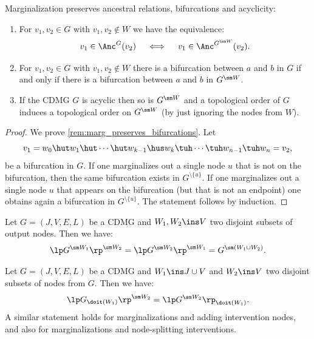 \begin{Rem}\label{rem:marg_preserves_ancestors_bifurcations_acyclicity}
Marginalization preserves ancestral relations, bifurcations and acyclicity:
    \begin{enumerate}
        \item For $v_1,v_2 \in G$ with $v_1,v_2 \notin W$ we have the equivalence:
            \[ v_1 \in \Anc^G(v_2)\quad \iff \quad v_1 \in \Anc^{G^{\sm W}}(v_2).   \]
          \item For $v_1,v_2 \in G$ with $v_1,v_2 \notin W$ there is a bifurcation between $a$ and $b$ in $G$ if and only if there is a bifurcation between $a$ and $b$ in $G^{\sm W}$.\label{rem:marg_preserves_bifurcations}
        \item If the CDMG $G$ is acyclic then so is $G^{\sm W}$ and a topological order of $G$ induces a 
            topological order on $G^{\sm W}$ (by just ignoring the nodes from $W$).
    \end{enumerate}
\end{Rem}
\begin{proof}
  We prove \ref{rem:marg_preserves_bifurcations}.
  Let \[v_1=w_0 \hut w_1 \hut  \cdots \hut w_{k-1} \hus w_k  \tuh \cdots \tuh w_{n-1} \tuh w_n=v_2,\]
     be a bifurcation in $G$. If one marginalizes out a single node $u$ that is not on the bifurcation,
     then the same bifurcation exists in $G^{\setminus\{u\}}$. If one marginalizes out a single node
     $u$ that appears on the bifurcation (but that is not an endpoint) one obtains again a bifurcation in $G^{\setminus\{u\}}$. 
     The statement follows by induction.
\end{proof}

\begin{Lem}\label{marginalizations-commute}
      Let $G=(J,V,E,L)$ be a CDMG and $W_1, W_2 \ins V$ two disjoint subsets of output nodes. 
      Then we have:
      \[ \lp G^{\sm W_1} \rp^{\sm W_2} = \lp G^{\sm W_2} \rp^{\sm W_1} =  G^{\sm (W_1 \cup W_2)}. \]
\end{Lem}

\begin{Lem}
      Let $G=(J,V,E,L)$ be a CDMG and $W_1 \ins J \cup V$ and $W_2 \ins V$ two disjoint subsets of nodes from $G$.
      Then we have:
      \[ \lp G_{\doit(W_1)} \rp^{\sm W_2} = \lp G^{\sm W_2} \rp_{\doit(W_1)}. \]
      A similar statement holds for marginalizations and adding intervention nodes, and also for marginalizations and node-splitting interventions.
\end{Lem}

